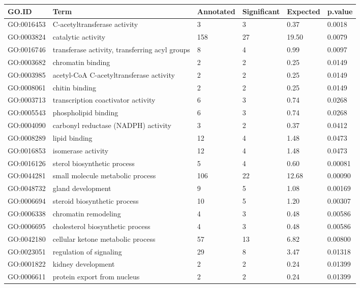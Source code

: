 \documentclass[10pt]{bmc_article}
\newenvironment{bmcformat}{\begin{raggedright}\baselineskip20pt\sloppy\setboolean{publ}{false}}{\end{raggedright}\baselineskip20pt\sloppy}
\begin{document}
\begin{bmcformat}
\begin{longtable}{lp{4.5cm}llll}
 GO.ID & Term & Annotated & Significant & Expected & p.value \\ 
  \hline
GO:0016453 & C-acetyltransferase activity &   3 &   3 & 0.37 & 0.0018 \\ 
  GO:0003824 & catalytic activity & 158 &  27 & 19.50 & 0.0079 \\ 
  GO:0016746 & transferase activity, transferring acyl groups &   8 &   4 & 0.99 & 0.0097 \\ 
  GO:0003682 & chromatin binding &   2 &   2 & 0.25 & 0.0149 \\ 
  GO:0003985 & acetyl-CoA C-acetyltransferase activity &   2 &   2 & 0.25 & 0.0149 \\ 
  GO:0008061 & chitin binding &   2 &   2 & 0.25 & 0.0149 \\ 
  GO:0003713 & transcription coactivator activity &   6 &   3 & 0.74 & 0.0268 \\ 
  GO:0005543 & phospholipid binding &   6 &   3 & 0.74 & 0.0268 \\ 
  GO:0004090 & carbonyl reductase (NADPH) activity &   3 &   2 & 0.37 & 0.0412 \\ 
  GO:0008289 & lipid binding &  12 &   4 & 1.48 & 0.0473 \\ 
  GO:0016853 & isomerase activity &  12 &   4 & 1.48 & 0.0473 \\ 
   \hline
GO:0016126 & sterol biosynthetic process &   5 &   4 & 0.60 & 0.00081 \\ 
  GO:0044281 & small molecule metabolic process & 106 &  22 & 12.68 & 0.00090 \\ 
  GO:0048732 & gland development &   9 &   5 & 1.08 & 0.00169 \\ 
  GO:0006694 & steroid biosynthetic process &  10 &   5 & 1.20 & 0.00307 \\ 
  GO:0006338 & chromatin remodeling &   4 &   3 & 0.48 & 0.00586 \\ 
  GO:0006695 & cholesterol biosynthetic process &   4 &   3 & 0.48 & 0.00586 \\ 
  GO:0042180 & cellular ketone metabolic process &  57 &  13 & 6.82 & 0.00800 \\ 
  GO:0023051 & regulation of signaling &  29 &   8 & 3.47 & 0.01318 \\ 
  GO:0001822 & kidney development &   2 &   2 & 0.24 & 0.01399 \\ 
  GO:0006611 & protein export from nucleus &   2 &   2 & 0.24 & 0.01399 \\ 

\end{longtable}
\end{bmcformat}
\end{document}
